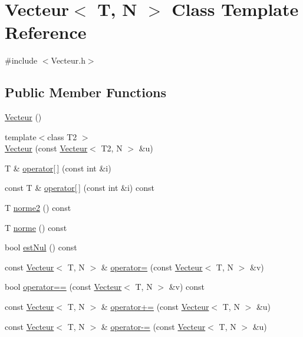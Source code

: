 \hypertarget{class_vecteur}{\section{Vecteur$<$ T, N $>$ Class Template Reference}
\label{class_vecteur}
}


{\ttfamily \#include $<$Vecteur.\-h$>$}

\subsection*{Public Member Functions}
\begin{DoxyCompactItemize}
\item 
\hyperlink{class_vecteur_a1138645efb6ed44618997e251c2b4009}{Vecteur} ()
\item 
{\footnotesize template$<$class T2 $>$ }\\\hyperlink{class_vecteur_aade7047bc2f5a25defc4a4e9a1d1be72}{Vecteur} (const \hyperlink{class_vecteur}{Vecteur}$<$ T2, N $>$ \&u)
\item 
T \& \hyperlink{class_vecteur_a738e84b97dd0eb0d18f1c22cca6308c0}{operator\mbox{[}$\,$\mbox{]}} (const int \&i)
\item 
const T \& \hyperlink{class_vecteur_acfa03e9e3f3f4e0550f355570c193658}{operator\mbox{[}$\,$\mbox{]}} (const int \&i) const 
\item 
T \hyperlink{class_vecteur_acc12011c6c561eb98505dd947915d5d3}{norme2} () const 
\item 
T \hyperlink{class_vecteur_ac839506f4c3fad8696eef68399e08ddd}{norme} () const 
\item 
bool \hyperlink{class_vecteur_a96cbeae90d0d5a5771a85823cf3ea069}{est\-Nul} () const 
\item 
const \hyperlink{class_vecteur}{Vecteur}$<$ T, N $>$ \& \hyperlink{class_vecteur_a61868c0f4a49218690f7e95f0c4953aa}{operator=} (const \hyperlink{class_vecteur}{Vecteur}$<$ T, N $>$ \&v)
\item 
bool \hyperlink{class_vecteur_a40916960c6af2ba46039d6638de1ee83}{operator==} (const \hyperlink{class_vecteur}{Vecteur}$<$ T, N $>$ \&v) const 
\item 
const \hyperlink{class_vecteur}{Vecteur}$<$ T, N $>$ \& \hyperlink{class_vecteur_a4f59d8249b46ee3ab38dc820bc498d4f}{operator+=} (const \hyperlink{class_vecteur}{Vecteur}$<$ T, N $>$ \&u)
\item 
const \hyperlink{class_vecteur}{Vecteur}$<$ T, N $>$ \& \hyperlink{class_vecteur_aa008838f93deafba755a4d3c52975d9b}{operator-\/=} (const \hyperlink{class_vecteur}{Vecteur}$<$ T, N $>$ \&u)

\end{DoxyCompactItemize}
